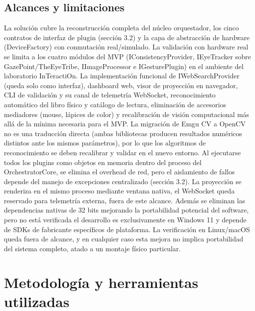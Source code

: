 \subsection{Alcances y limitaciones}
La solución cubre la reconstrucción completa del núcleo orquestador, los cinco contratos de interfaz de plugin (sección 3.2) y la capa de abstracción de hardware (DeviceFactory) con conmutación real/simulado. La validación con hardware real se limita a los cuatro módulos del MVP (IConsistencyProvider, IEyeTracker sobre GazePoint/TheEyeTribe, IImageProcessor e IGesturePlugin) en el ambiente del laboratorio InTeractiOn. La implementación funcional de IWebSearchProvider (queda solo como interfaz), dashboard web, visor de proyección en navegador, CLI de validación y su canal de telemetría WebSocket, reconocimiento automático del libro físico y catálogo de lectura, eliminación de accesorios mediadores (mouse, lápices de color) y recalibración de visión computacional más allá de la mínima necesaria para el MVP. La migración de Emgu CV a OpenCV no es una traducción directa (ambas bibliotecas producen resultados numéricos distintos ante los mismos parámetros), por lo que los algoritmos de reconocimiento se deben recalibrar y validar en el nuevo entorno. Al ejecutarse todos los plugins como objetos en memoria dentro del proceso del OrchestratorCore, se elimina el overhead de red, pero el aislamiento de fallos depende del manejo de excepciones centralizado (sección 3.2). La proyección se renderiza en el mismo proceso mediante ventana nativa, el WebSocket queda reservado para telemetría externa, fuera de este alcance. Además se eliminan las dependencias nativas de 32 bits mejorando la portabilidad potencial del software, pero no está verificada el desarrollo es exclusivamente en Windows 11 y depende de SDKs de fabricante específicos de plataforma. La verificación en Linux/macOS queda fuera de alcance, y en cualquier caso esta mejora no implica portabilidad del sistema completo, atado a un montaje físico particular.

\section{Metodolog\'ia y herramientas utilizadas}
\label{intro:metodologia}

